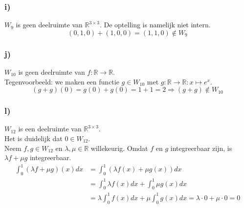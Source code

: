 \documentclass[lineaire_algebra_oplossingen.tex]{subfiles}
\begin{document}
\subsubsection*{i)}
$W_9$ is geen deelruimte van $\mathbb{R}^{3\times 3}$. De optelling is namelijk niet intern.
\[
(0,1,0) + (1,0,0) = (1,1,0) \not \in W_9
\]

\subsubsection*{j)}
$W_{10}$ is geen deelruimte van $f:\mathbb{R}\rightarrow\mathbb{R}$.\\
Tegenvoorbeeld: we maken een functie $g \in W_{10}$ met $g : \mathbb{R}\rightarrow\mathbb{R} : x \mapsto e^x$.
\[
(g+g)(0) = g(0) + g(0) = 1+1 = 2 \Longrightarrow (g+g) \not \in W_{10}
\]

\subsubsection*{l)}
$W_{12}$ is een deelruimte van $\mathbb{R}^{3\times 3}$.\\
Het is duidelijk dat $0 \in W_{12}$.\\
Neem $f, g \in W_{12}$ en $\lambda, \mu \in \mathbb{R}$ willekeurig. Omdat $f$ en $g$ integreerbaar zijn, is $\lambda f + \mu g$ integreerbaar.
\begin{align*}
  \int^1_0 (\lambda f + \mu g)(x)dx &= \int^1_0(\lambda f(x) + \mu g(x))dx\\
  &= \int^1_0 \lambda f(x)dx + \int^1_0 \mu g(x)dx\\
  &= \lambda \int^1_0 f(x)dx + \mu \int^1_0 g(x)dx = \lambda \cdot 0 + \mu \cdot 0 = 0
\end{align*}
\end{document}
